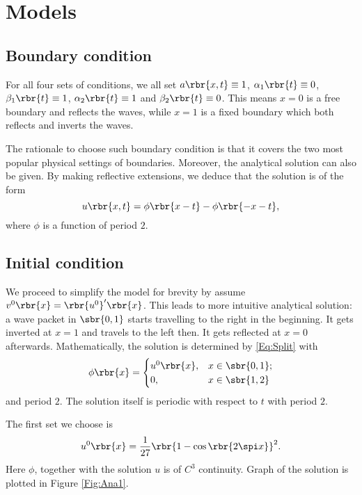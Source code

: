\documentclass[english, nochinese]{pnote}
\begin{document}
\section{Models}

\subsection{Boundary condition}

For all four sets of conditions, we all set $ a \rbr{ x, t } \equiv 1 $, $ \alpha_1 \rbr{t} \equiv 0 $, $ \beta_1 \rbr{t} \equiv 1 $, $ \alpha_2 \rbr{t} \equiv 1 $ and $ \beta_2 \rbr{t} \equiv 0 $. This means $ x = 0 $ is a free boundary and reflects the waves, while $ x = 1 $ is a fixed boundary which both reflects and inverts the waves.

The rationale to choose such boundary condition is that it covers the two most popular physical settings of boundaries. Moreover, the analytical solution can also be given. By making reflective extensions, we deduce that the solution is of the form
\begin{equation} \label{Eq:Split}
u \rbr{ x, t } = \phi \rbr{ x - t } - \phi \rbr{ -x - t },
\end{equation}
where $\phi$ is a function of period $2$.

\subsection{Initial condition}

We proceed to simplify the model for brevity by assume $ v^0 \rbr{x} = \rbr{u^0}' \rbr{x} $. This leads to more intuitive analytical solution: a wave packet in $ \sbr{ 0, 1 } $ starts travelling to the right in the beginning. It gets inverted at $ x = 1 $ and travels to the left then. It gets reflected at $ x = 0 $ afterwards. Mathematically, the solution is determined by \eqref{Eq:Split} with
\begin{equation}
\phi \rbr{x} =
\begin{cases}
u^0 \rbr{x}, & x \in \sbr{ 0, 1 }; \\
0, & x \in \sbr{ 1, 2 }
\end{cases}
\end{equation}
and period $2$. The solution itself is periodic with respect to $t$ with period $2$.

The first set we choose is
\begin{equation}
u^0 \rbr{x} = \frac{1}{27} \rbr{ 1 - \cos \rbr{ 2 \spi x } }^2.
\end{equation}
Here $\phi$, together with the solution $u$ is of $C^3$ continuity. Graph of the solution is plotted in Figure \ref{Fig:Ana1}.
\end{document}
